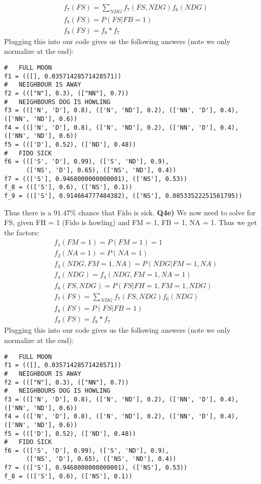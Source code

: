 \documentclass{article}
\begin{document}
\begin{titlepage}
\begin{align*}
& f_7(FS) = \sum_{NDG} f_7(FS, NDG)f_6(NDG)  \\
& f_8(FS) = P(FS |FB = 1) \\
& f_9(FS) = f_8*f_7
\end{align*}
Plugging this into our code gives us the following answers (note we only normalize at the end):
\begin{lstlisting}
#   FULL MOON
f1 = (([], 0.03571428571428571))
#   NEIGHBOUR IS AWAY
f2 = ((["N"], 0.3), (["NN"], 0.7))
#   NEIGHBOURS DOG IS HOWLING
f3 = ((['N', 'D'], 0.8), (['N', 'ND'], 0.2), (['NN', 'D'], 0.4), (['NN', 'ND'], 0.6))
f4 = ((['N', 'D'], 0.8), (['N', 'ND'], 0.2), (['NN', 'D'], 0.4), (['NN', 'ND'], 0.6))
f5 = ((['D'], 0.52), (['ND'], 0.48))
#   FIDO SICK
f6 = ((['S', 'D'], 0.99), (['S', 'ND'], 0.9), 
	  (['NS', 'D'], 0.65), (['NS', 'ND'], 0.4))
f7 = ((['S'], 0.9468000000000001), (['NS'], 0.53))
f_8 = ((['S'], 0.6), (['NS'], 0.1))
f_9 = ((['S'], 0.914664777484382), (['NS'], 0.08533522251561795))
\end{lstlisting}
Thus there is a $91.47\%$ chance that Fido is sick.
\newpage
\textbf{Q4e)} We now need to solve for FS, given FH = 1 (Fido is howling) and FM = 1, FB = 1, NA = 1. Thus we get the factors:
\begin{align*}
& f_1(FM = 1) = P(FM = 1) = 1 \\ 
& f_2(NA = 1) = P(NA = 1) \\
& f_3(NDG, FM = 1, NA) = P(NDG | FM = 1, NA) \\
& f_4(NDG) = f_4(NDG, FM = 1, NA = 1)  \\
& f_6(FS, NDG) = P(FS | FH = 1, FM = 1, NDG) \\
& f_7(FS) = \sum_{NDG} f_7(FS, NDG)f_6(NDG)  \\
& f_8(FS) = P(FS |FB = 1) \\
& f_9(FS) = f_8*f_7
\end{align*}
Plugging this into our code gives us the following answers (note we only normalize at the end):
\begin{lstlisting}
#   FULL MOON
f1 = (([], 0.03571428571428571))
#   NEIGHBOUR IS AWAY
f2 = ((["N"], 0.3), (["NN"], 0.7))
#   NEIGHBOURS DOG IS HOWLING
f3 = ((['N', 'D'], 0.8), (['N', 'ND'], 0.2), (['NN', 'D'], 0.4), (['NN', 'ND'], 0.6))
f4 = ((['N', 'D'], 0.8), (['N', 'ND'], 0.2), (['NN', 'D'], 0.4), (['NN', 'ND'], 0.6))
f5 = ((['D'], 0.52), (['ND'], 0.48))
#   FIDO SICK
f6 = ((['S', 'D'], 0.99), (['S', 'ND'], 0.9), 
	  (['NS', 'D'], 0.65), (['NS', 'ND'], 0.4))
f7 = ((['S'], 0.9468000000000001), (['NS'], 0.53))
f_8 = ((['S'], 0.6), (['NS'], 0.1))

\end{lstlisting}
\end{titlepage}
\end{document}
